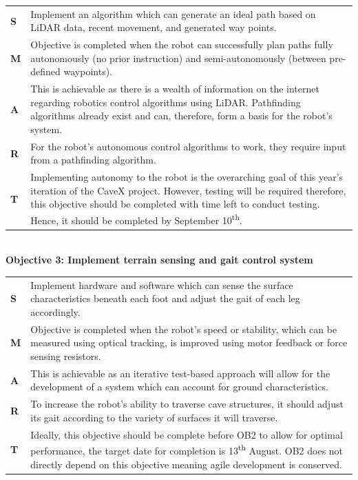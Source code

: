 \begin{tabularx}{\textwidth}{M{1cm}|R{14cm}}
    \textbf{S} & Implement an algorithm which can generate an ideal path based on LiDAR data, recent movement, and generated way points.\\
    \textbf{M} & Objective is completed when the robot can successfully plan paths fully autonomously (no prior instruction) and semi-autonomously (between pre-defined waypoints). \\
    \textbf{A} & This is achievable as there is a wealth of information on the internet regarding robotics control algorithms using LiDAR. Pathfinding algorithms already exist and can, therefore, form a basis for the robot’s system. \\
    \textbf{R} & For the robot’s autonomous control algorithms to work, they require input from a pathfinding algorithm. \\
    \textbf{T} & Implementing autonomy to the robot is the overarching goal of this year’s iteration of the CaveX project. However, testing will be required therefore, this objective should be completed with time left to conduct testing. Hence, it should be completed by September 10\textsuperscript{th}.
\end{tabularx}\\

\newpage
\textbf{Objective 3: Implement terrain sensing and gait control system}

\begin{tabularx}{\textwidth}{M{1cm}|R{14cm}}
    \textbf{S} & Implement hardware and software which can sense the surface characteristics beneath each foot and adjust the gait of each leg accordingly.\\
    \textbf{M} & Objective is completed when the robot’s speed or stability, which can be measured using optical tracking, is improved using motor feedback or force sensing resistors. \\
    \textbf{A} & This is achievable as an iterative test-based approach will allow for the development of a system which can account for ground characteristics. \\
    \textbf{R} & To increase the robot’s ability to traverse cave structures, it should adjust its gait according to the variety of surfaces it will traverse. \\
    \textbf{T} & Ideally, this objective should be complete before OB2 to allow for optimal performance, the target date for completion is 13\textsuperscript{th} August. OB2 does not directly depend on this objective meaning agile development is conserved. \\
\end{tabularx}

